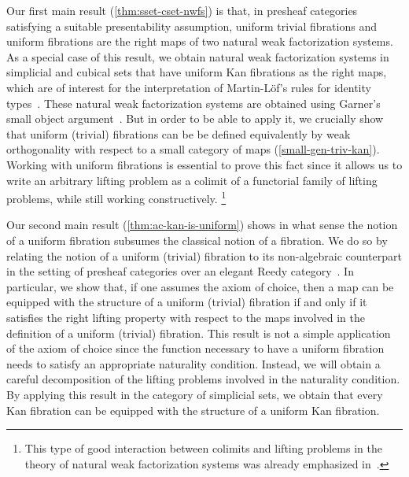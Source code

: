 \documentclass[reqno,10pt,a4paper,oneside,draft]{amsart}
\begin{document}
Our first main result (\cref{thm:sset-cset-nwfs}) is that, in presheaf categories satisfying a suitable presentability assumption, uniform trivial fibrations and uniform fibrations are the right maps of two natural weak factorization systems.
As a special case of this result, we obtain natural weak factorization systems in simplicial and cubical sets that have uniform Kan fibrations as the right maps, which are of interest for the interpretation of Martin-L\"of's rules for identity types~\cite{awodey-warren:homotopy-idtype,gambino-garner:idtypewfs,warren:thesis,garner:topological-simplicial,shulman:inverse-diagrams}.
These natural weak factorization systems are obtained using Garner's small object argument~\cite{garner:small-object-argument}.
But in order to be able to apply it, we crucially show that uniform (trivial) fibrations can be be defined equivalently by weak orthogonality with respect to a small category of maps (\cref{small-gen-triv-kan}).
Working with uniform fibrations is essential to prove this fact since it allows us to write an arbitrary lifting problem as a colimit of a functorial family of lifting problems, while still working constructively.%
\footnote{This type of good interaction between colimits and lifting problems in the theory of natural weak factorization systems was already emphasized in~\cite{riehl-cat-homotopy}.}


Our second main result (\cref{thm:ac-kan-is-uniform}) shows in what sense the notion of a uniform fibration subsumes the classical notion of a fibration.
We do so by relating the notion of a uniform (trivial) fibration to its non-algebraic counterpart in the setting of presheaf categories over an elegant Reedy category~\cite{bergner-rezk-elegant}.
In particular, we show that, if one assumes the axiom of choice, then a map can be equipped with the structure of a uniform (trivial) fibration if and only if it satisfies the right lifting property with respect to the maps involved in the definition of a uniform (trivial) fibration.
This result is not a simple application of the axiom of choice since the function necessary to have a uniform fibration needs to satisfy an appropriate naturality condition.
Instead, we will obtain a careful decomposition of the lifting problems involved in the naturality condition.
By applying this result in the category of simplicial sets, we obtain that every Kan fibration can be equipped with the structure of a uniform Kan fibration.
\end{document}
